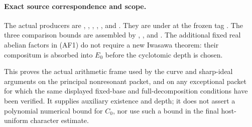 \paragraph{Exact source correspondence and scope.}
The actual producers are
,
,
,
, ,
and
.
They are under
at the frozen tag .
The three comparison bounds are assembled by
,
, and .
The additional fixed real abelian factors in (AF1)
do not require a new Iwasawa theorem:
their compositum is absorbed into \(E_0\) before
the cyclotomic depth is chosen.

This proves the actual arithmetic frame used by
the curve and sharp-ideal arguments on the
principal nonresonant packet, and on any exceptional
packet for which the same displayed fixed-base and
full-decomposition conditions have been verified.
It supplies auxiliary existence and depth; it
does not assert a polynomial numerical bound for
\(C_0\), nor use such a bound in the final
host-uniform character estimate.
